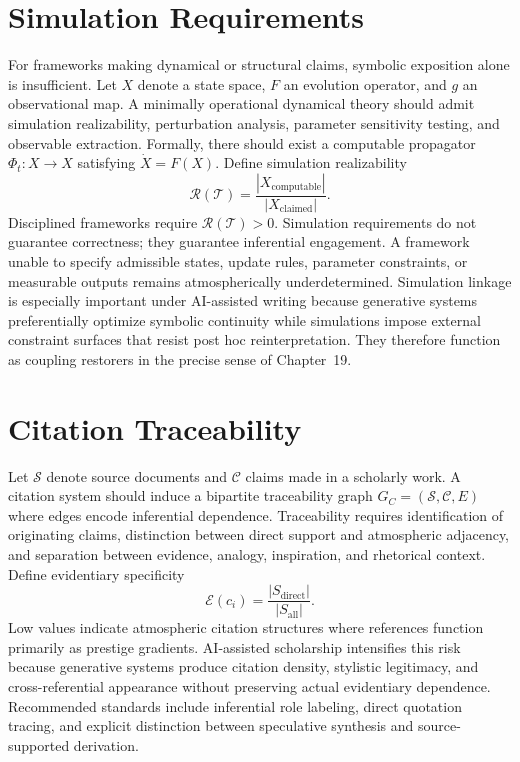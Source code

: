 \documentclass[12pt, openright, twoside]{book}
\begin{document}
\section{Simulation Requirements}

For frameworks making dynamical or structural claims, symbolic exposition
alone is insufficient. Let $X$ denote a state space, $F$ an evolution
operator, and $g$ an observational map. A minimally operational dynamical
theory should admit simulation realizability, perturbation analysis,
parameter sensitivity testing, and observable extraction. Formally, there
should exist a computable propagator $\Phi_t : X \to X$ satisfying
$\dot{X} = F(X)$. Define simulation realizability
\[
\mathcal{R}(\mathcal{T})
= \frac{|X_{\mathrm{computable}}|}{|X_{\mathrm{claimed}}|}.
\]
Disciplined frameworks require $\mathcal{R}(\mathcal{T}) > 0$. Simulation
requirements do not guarantee correctness; they guarantee inferential
engagement. A framework unable to specify admissible states, update rules,
parameter constraints, or measurable outputs remains atmospherically
underdetermined. Simulation linkage is especially important under
AI-assisted writing because generative systems preferentially optimize
symbolic continuity while simulations impose external constraint surfaces
that resist post hoc reinterpretation. They therefore function as coupling
restorers in the precise sense of Chapter~19.

\section{Citation Traceability}

Let $\mathcal{S}$ denote source documents and $\mathcal{C}$ claims made
in a scholarly work. A citation system should induce a bipartite
traceability graph $G_C = (\mathcal{S}, \mathcal{C}, E)$ where edges
encode inferential dependence. Traceability requires identification of
originating claims, distinction between direct support and atmospheric
adjacency, and separation between evidence, analogy, inspiration, and
rhetorical context. Define evidentiary specificity
\[
\mathcal{E}(c_i)
= \frac{|S_{\mathrm{direct}}|}{|S_{\mathrm{all}}|}.
\]
Low values indicate atmospheric citation structures where references
function primarily as prestige gradients. AI-assisted scholarship
intensifies this risk because generative systems produce citation density,
stylistic legitimacy, and cross-referential appearance without preserving
actual evidentiary dependence. Recommended standards include inferential
role labeling, direct quotation tracing, and explicit distinction between
speculative synthesis and source-supported derivation.
\end{document}
